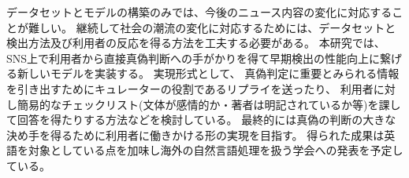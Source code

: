 
\vspace{20pt}
データセットとモデルの構築のみでは、今後のニュース内容の変化に対応することが難しい。
継続して社会の潮流の変化に対応するためには、データセットと検出方法及び利用者の反応を得る方法を工夫する必要がある。
本研究では、SNS上で利用者から直接真偽判断への手がかりを得て早期検出の性能向上に繋げる新しいモデルを実装する。
実現形式として、
真偽判定に重要とみられる情報を引き出すためにキュレーターの役割であるリプライを送ったり、
利用者に対し簡易的なチェックリスト(文体が感情的か・著者は明記されているか等)を課して回答を得たりする方法などを検討している。
最終的には真偽の判断の大きな決め手を得るために利用者に働きかける形の実現を目指す。
得られた成果は英語を対象としている点を加味し海外の自然言語処理を扱う学会への発表を予定している。

